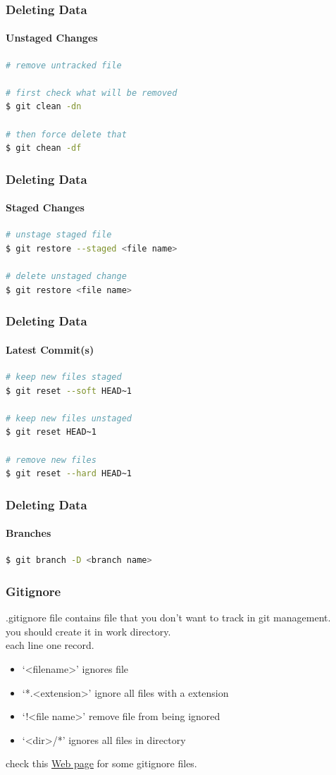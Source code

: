\documentclass{beamer}
\begin{document}
	\begin{frame}[fragile]
		\frametitle{Deleting Data}
		\framesubtitle{Unstaged Changes}
		
\begin{lstlisting}[language=bash]
# remove untracked file

# first check what will be removed
$ git clean -dn

# then force delete that
$ git chean -df
\end{lstlisting}
	\end{frame}
	
	\begin{frame}[fragile]
		\frametitle{Deleting Data}
		\framesubtitle{Staged Changes}
		
\begin{lstlisting}[language=bash]
# unstage staged file
$ git restore --staged <file name>

# delete unstaged change
$ git restore <file name>
\end{lstlisting}
	\end{frame}

	\begin{frame}[fragile]
		\frametitle{Deleting Data}
		\framesubtitle{Latest Commit(s)}
		
\begin{lstlisting}[language=bash]
# keep new files staged
$ git reset --soft HEAD~1

# keep new files unstaged
$ git reset HEAD~1

# remove new files
$ git reset --hard HEAD~1
\end{lstlisting}
	\end{frame}

	\begin{frame}[fragile]
		\frametitle{Deleting Data}
		\framesubtitle{Branches}
		
\begin{lstlisting}[language=bash]
$ git branch -D <branch name>
\end{lstlisting}
	\end{frame}
	
	\begin{frame}
		\frametitle{Gitignore}
		
		.gitignore file contains file that you don't want to track in git management.\\
		you should create it in work directory.\\
		each line one record.
		
		\begin{itemize}
			\item `<filename>' ignores file
			\item `*.<extension>' ignore all files with a extension
			\item `!<file name>' remove file from being ignored
			\item `<dir>/*' ignores all files in directory
		\end{itemize}
		
		check this \textcolor{light-primary}{\href{https://github.com/github/gitignore}{Web page}} for some gitignore files.
	\end{frame}
	
\end{document}
